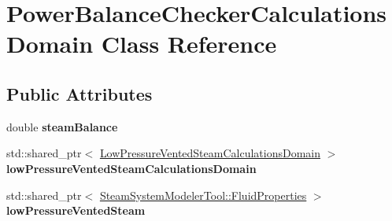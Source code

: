 \hypertarget{class_power_balance_checker_calculations_domain}{}\section{Power\+Balance\+Checker\+Calculations\+Domain Class Reference}
\label{class_power_balance_checker_calculations_domain}
\subsection*{Public Attributes}
\begin{DoxyCompactItemize}
\item 
\mbox{\label{class_power_balance_checker_calculations_domain_a221410ee2faaa99e90625b5a32847bbf}} 
double {\bfseries steam\+Balance}
\item 
\mbox{\label{class_power_balance_checker_calculations_domain_acb3fc0f63b8e2ed2048f05770b1e69ea}} 
std\+::shared\+\_\+ptr$<$ \hyperlink{class_low_pressure_vented_steam_calculations_domain}{Low\+Pressure\+Vented\+Steam\+Calculations\+Domain} $>$ {\bfseries low\+Pressure\+Vented\+Steam\+Calculations\+Domain}
\item 
\mbox{\label{class_power_balance_checker_calculations_domain_a0041cbcd056ba9bd45b307b6c16b6729}} 
std\+::shared\+\_\+ptr$<$ \hyperlink{struct_steam_system_modeler_tool_1_1_fluid_properties}{Steam\+System\+Modeler\+Tool\+::\+Fluid\+Properties} $>$ {\bfseries low\+Pressure\+Vented\+Steam}
\end{DoxyCompactItemize}
